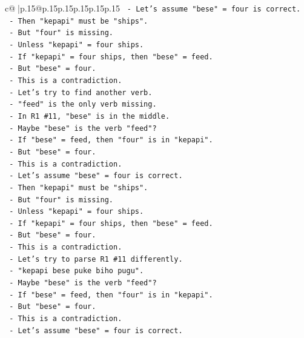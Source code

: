 \documentclass{article}
\begin{document}
{\begin{supertabular}{c@{$\;$}|p{.15\linewidth}@{}p{.15\linewidth}p{.15\linewidth}p{.15\linewidth}p{.15\linewidth}p{.15\linewidth}}
{{{\texttt{        {-} Let's assume "bese" = four is correct.} \\
\texttt{        {-} Then "kepapi" must be "ships".} \\
\texttt{        {-} But "four" is missing.} \\
\texttt{        {-} Unless "kepapi" = four ships.} \\
\texttt{        {-} If "kepapi" = four ships, then "bese" = feed.} \\
\texttt{        {-} But "bese" = four.} \\
\texttt{        {-} This is a contradiction.} \\
\texttt{        {-} Let's try to find another verb.} \\
\texttt{        {-} "feed" is the only verb missing.} \\
\texttt{        {-} In R1 \#11, "bese" is in the middle.} \\
\texttt{        {-} Maybe "bese" is the verb "feed"?} \\
\texttt{        {-} If "bese" = feed, then "four" is in "kepapi".} \\
\texttt{        {-} But "bese" = four.} \\
\texttt{        {-} This is a contradiction.} \\
\texttt{        {-} Let's assume "bese" = four is correct.} \\
\texttt{        {-} Then "kepapi" must be "ships".} \\
\texttt{        {-} But "four" is missing.} \\
\texttt{        {-} Unless "kepapi" = four ships.} \\
\texttt{        {-} If "kepapi" = four ships, then "bese" = feed.} \\
\texttt{        {-} But "bese" = four.} \\
\texttt{        {-} This is a contradiction.} \\
\texttt{        {-} Let's try to parse R1 \#11 differently.} \\
\texttt{        {-} "kepapi bese puke biho pugu".} \\
\texttt{        {-} Maybe "bese" is the verb "feed"?} \\
\texttt{        {-} If "bese" = feed, then "four" is in "kepapi".} \\
\texttt{        {-} But "bese" = four.} \\
\texttt{        {-} This is a contradiction.} \\
\texttt{        {-} Let's assume "bese" = four is correct.} \\
}}}
\end{supertabular}}
\end{document}
